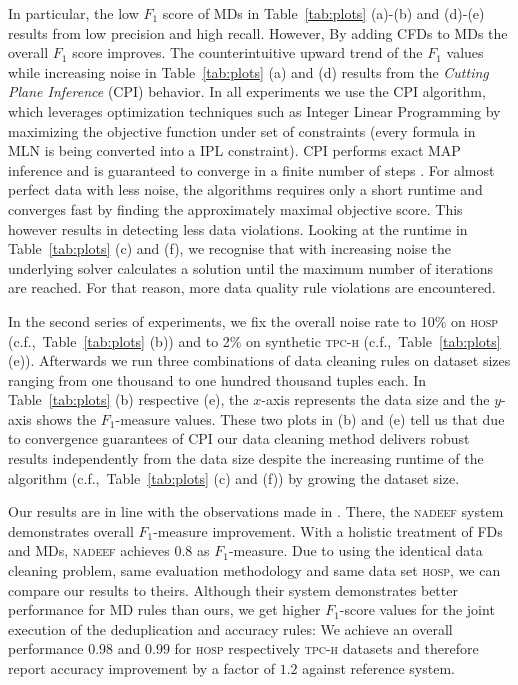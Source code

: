In particular, the low $F_1$ score of MDs in Table~\ref{tab:plots} (a)-(b) and (d)-(e) results from low precision and high recall. However, By adding CFDs to MDs the overall $F_1$ score improves. The counterintuitive upward trend of the $F_1$ values while increasing noise in Table~\ref{tab:plots} (a) and (d) results from the \textit{Cutting Plane Inference} (CPI) \cite{riedel08improving} behavior. In all experiments we use the CPI algorithm, which leverages optimization techniques such as Integer Linear Programming \cite{riedel08improving, NoessnerNS13} by maximizing the objective function under set of constraints (every formula in MLN is being converted into a IPL constraint). CPI performs exact MAP inference and is guaranteed to converge in a finite number of steps \cite{riedel08improving}. %
For almost perfect data with less noise, the algorithms requires only a short runtime and converges fast by finding the approximately maximal objective score. This however results in detecting less data violations. Looking at the runtime in Table~\ref{tab:plots} (c) and (f), we recognise that with increasing noise the underlying solver calculates a solution until the maximum number of iterations are reached. For that reason, more data quality rule violations are encountered. 

In the second series of experiments, we fix the overall noise rate to 10\% on \textsc{hosp} (c.f.,~Table~\ref{tab:plots} (b)) and to 2\% on synthetic \textsc{tpc-h} (c.f.,~Table~\ref{tab:plots} (e)). Afterwards we run three combinations of data cleaning rules on dataset sizes ranging from one thousand to one hundred thousand tuples each. In Table~\ref{tab:plots} (b) respective (e), the $x$-axis represents the data size and the $y$-axis shows the $F_1$-measure values. These two plots in (b) and (e) tell us that due to convergence guarantees of CPI our data cleaning method delivers robust results independently from the data size despite the increasing runtime of the algorithm (c.f.,~Table~\ref{tab:plots} (c) and (f)) by growing the dataset size. %

Our results are in line with the observations made in \cite{Dallachiesa:2013:NCD:2463676.2465327}. There, the \textsc{nadeef} system demonstrates overall $F_1$-measure improvement. With a holistic treatment of FDs and MDs, \textsc{nadeef} achieves $0.8$ as $F_1$-measure. Due to using the identical data cleaning problem, same evaluation methodology and same data set \textsc{hosp}, we can compare our results to theirs. Although their system demonstrates better performance for MD rules than ours, we get higher $F_1$-score values for the joint execution of the deduplication and accuracy rules: We achieve an overall performance $0.98$ and $0.99$ for \textsc{hosp} respectively \textsc{tpc-h} datasets and therefore report accuracy improvement by a factor of $1.2$ against reference system. %

